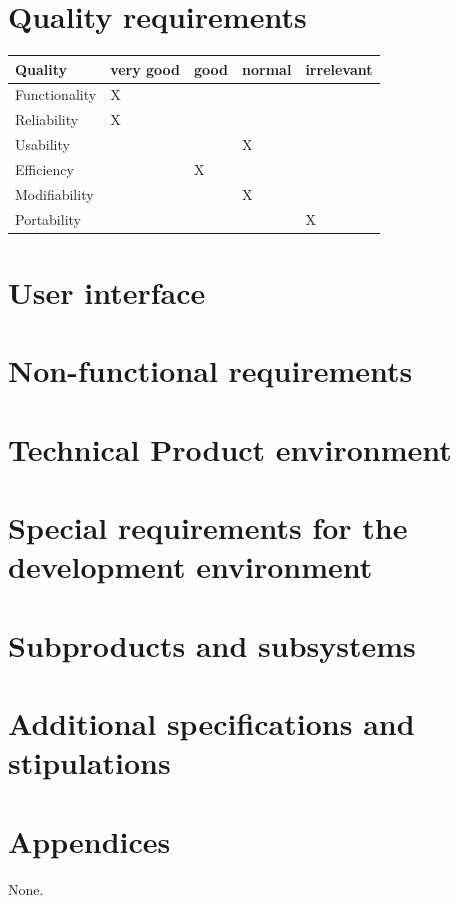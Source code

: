 \documentclass[11pt,a4paper,oneside,svgnames]{report}
\begin{document}
\chapter{Quality requirements}
\begin{table}[h!]
 \begin{tabular}{lllll}
  \hline
  Quality & very good & good & normal & irrelevant \\
  \hline
  Functionality & X & & & \\
  Reliability & X & & & \\
  Usability & & & X & \\
  Efficiency & & X & & \\
  Modifiability & & & X & \\
  Portability & & & & X \\
  \hline
 \end{tabular}
\end{table}

\chapter{User interface}
\chapter{Non-functional requirements}
\chapter{Technical Product environment}
\chapter{Special requirements for the development environment}
\chapter{Subproducts and subsystems}
\chapter{Additional specifications and stipulations}
\chapter{Appendices}
None.
\end{document}
